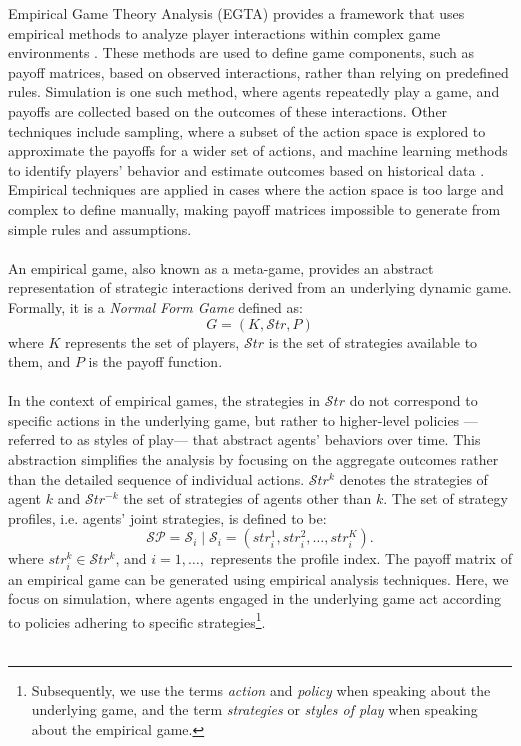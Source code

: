\begin{flushleft}

    Empirical Game Theory Analysis (EGTA) provides a framework that uses empirical methods to analyze player interactions within complex game environments \cite{Levet2016GameT}. These methods are used to define game components, such as payoff matrices, based on observed interactions, rather than relying on predefined rules. Simulation is one such method, where agents repeatedly play a game, and payoffs are collected based on the outcomes of these interactions. Other techniques include sampling, where a subset of the action space is explored to approximate the payoffs for a wider set of actions, and machine learning methods to identify players' behavior and estimate outcomes based on historical data \cite{wellman2024empiricalgametheoreticanalysissurvey}. Empirical techniques are applied in cases where the action space is too large and complex to define manually, making payoff matrices impossible to generate from simple rules and assumptions.\\~\\

    An empirical game, also known as a meta-game, provides an abstract representation of strategic interactions derived from an underlying dynamic game. Formally, it is a \emph{Normal Form Game} defined as:
    \begin{equation}
        G = (K, \mathcal{S}tr, P)
        \label{eq:nfg}
    \end{equation}        
    where $K$ represents the set of players, $\mathcal{S}tr$ is the set of strategies available to them, and $P$ is the payoff function.\\~\\
    
    In the context of empirical games, the strategies in $\mathcal{S}tr$ do not correspond to specific actions in the underlying game, but rather to higher-level policies —referred to as styles of play— that abstract agents' behaviors over time. This abstraction simplifies the analysis by focusing on the aggregate outcomes rather than the detailed sequence of individual actions. $\mathcal{S}tr^k$ denotes the strategies of agent $k$ and $\mathcal{S}tr^{-k}$ the set of strategies of agents other than $k$. The set of strategy profiles, i.e. agents' joint strategies, is defined to be:
    \begin{equation}
        \mathcal{SP} = \mathcal{S}_i \mid \mathcal{S}_i = (str_i^1, str_i^2, \dots, str_i^K).
        \label{eq:strategy_profiles}
    \end{equation}
    where $str_i^k \in \mathcal{S}tr^k$, and $i = 1, \dots,$ represents the profile index. The payoff matrix of an empirical game can be generated using empirical analysis techniques. Here, we focus on simulation, where agents engaged in the underlying game act according to policies adhering to specific strategies\footnote{Subsequently, we use the terms \emph{action} and \emph{policy} when speaking about the underlying game, and the term \emph{strategies} or \emph{styles of play} when speaking about the empirical game.}.\\~\\
    

\end{flushleft}
